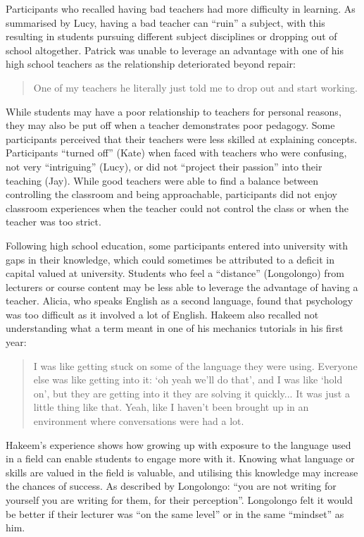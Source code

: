 Participants who recalled having bad teachers had more difficulty in learning.  As summarised by Lucy, having a bad teacher can ``ruin'' a subject, with this resulting in students pursuing different subject disciplines or dropping out of school altogether. Patrick was unable to leverage an advantage with one of his high school teachers as the relationship deteriorated beyond repair: \blockquote{One of my teachers he literally just told me to drop out and start working.} While students may have a poor relationship to teachers for personal reasons, they may also be put off when a teacher demonstrates poor pedagogy. Some participants perceived that their teachers were less skilled at explaining concepts. Participants ``turned off'' (Kate) when faced with teachers who were confusing, not very ``intriguing'' (Lucy), or did not ``project their passion'' into their teaching (Jay). While good teachers were able to find a balance between controlling the classroom and being approachable, participants did not enjoy classroom experiences when the teacher could not control the class or when the teacher was too strict. 

Following high school education, some participants entered into university with gaps in their knowledge, which could sometimes be attributed to a deficit in capital valued at university.  Students who feel a  ``distance'' (Longolongo) from lecturers or course content may be less able to leverage the advantage of having a teacher. Alicia, who speaks English as a second language, found that psychology was too difficult as it involved a lot of English. Hakeem also recalled not understanding what a term meant in one of his mechanics tutorials in his first year: \blockquote{I was like getting stuck on some of the language they were using. Everyone else was like getting into it: `oh yeah we’ll do that', and I was like `hold on', but they are getting into it they are solving it quickly... It was just a little thing like that. Yeah, like I haven’t been brought up in an environment where conversations were had a lot.} Hakeem's experience shows how growing up with exposure to the language used in a field can enable students to engage more with it. Knowing what language or skills are valued in the field is valuable, and utilising this knowledge may increase the chances of success. As described by Longolongo: ``you are not writing for yourself you are writing for them, for their perception''. Longolongo felt it would be better if their lecturer was ``on the same level'' or in the same ``mindset'' as him. 

